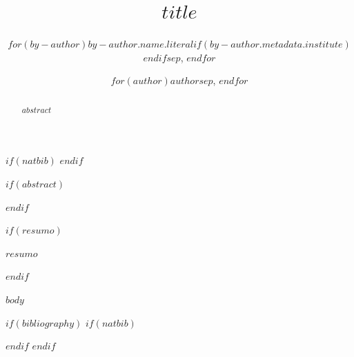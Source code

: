 \documentclass[12pt]{article}
\title{$title$}
\author{$for(by-author)$$by-author.name.literal$$if(by-author.metadata.institute)$\inst{$by-author.metadata.institute$}$endif$$sep$, $endfor$}
\author{$for(author)$$author$$sep$, $endfor$}
\makeatletter
\let\quartosbcnatbiblbibitem\@lbibitem
\makeatother
\begin{document}
$if(natbib)$
\makeatletter
\let\@lbibitem\quartosbcnatbiblbibitem
\makeatother
$endif$

\maketitle

$if(abstract)$
\begin{abstract}
$abstract$
\end{abstract}
$endif$

$if(resumo)$
\begin{resumo}
$resumo$
\end{resumo}
$endif$

$body$

$if(bibliography)$
$if(natbib)$


$endif$
$endif$
\end{document}
